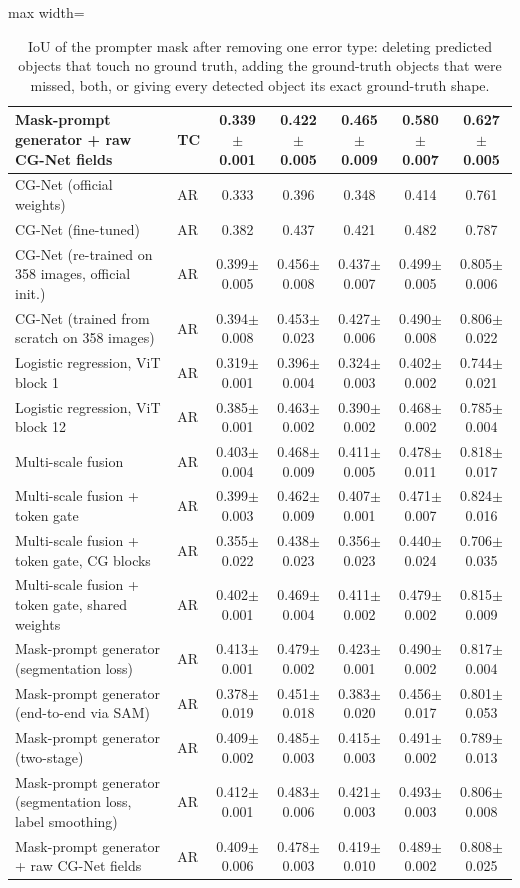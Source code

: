 \begin{table}[htbp]
\begin{adjustbox}{max width=\linewidth}
\begin{tabular}{llccccc}
Mask-prompt generator + raw CG-Net fields & TC & 0.339$\pm$0.001 & 0.422$\pm$0.005 & 0.465$\pm$0.009 & 0.580$\pm$0.007 & 0.627$\pm$0.005 \\
\midrule
CG-Net (official weights) & AR & 0.333 & 0.396 & 0.348 & 0.414 & 0.761 \\
CG-Net (fine-tuned) & AR & 0.382 & 0.437 & 0.421 & 0.482 & 0.787 \\
CG-Net (re-trained on 358 images, official init.) & AR & 0.399$\pm$0.005 & 0.456$\pm$0.008 & 0.437$\pm$0.007 & 0.499$\pm$0.005 & 0.805$\pm$0.006 \\
CG-Net (trained from scratch on 358 images) & AR & 0.394$\pm$0.008 & 0.453$\pm$0.023 & 0.427$\pm$0.006 & 0.490$\pm$0.008 & 0.806$\pm$0.022 \\
Logistic regression, ViT block 1 & AR & 0.319$\pm$0.001 & 0.396$\pm$0.004 & 0.324$\pm$0.003 & 0.402$\pm$0.002 & 0.744$\pm$0.021 \\
Logistic regression, ViT block 12 & AR & 0.385$\pm$0.001 & 0.463$\pm$0.002 & 0.390$\pm$0.002 & 0.468$\pm$0.002 & 0.785$\pm$0.004 \\
Multi-scale fusion & AR & 0.403$\pm$0.004 & 0.468$\pm$0.009 & 0.411$\pm$0.005 & 0.478$\pm$0.011 & 0.818$\pm$0.017 \\
Multi-scale fusion + token gate & AR & 0.399$\pm$0.003 & 0.462$\pm$0.009 & 0.407$\pm$0.001 & 0.471$\pm$0.007 & 0.824$\pm$0.016 \\
Multi-scale fusion + token gate, CG blocks & AR & 0.355$\pm$0.022 & 0.438$\pm$0.023 & 0.356$\pm$0.023 & 0.440$\pm$0.024 & 0.706$\pm$0.035 \\
Multi-scale fusion + token gate, shared weights & AR & 0.402$\pm$0.001 & 0.469$\pm$0.004 & 0.411$\pm$0.002 & 0.479$\pm$0.002 & 0.815$\pm$0.009 \\
Mask-prompt generator (segmentation loss) & AR & 0.413$\pm$0.001 & 0.479$\pm$0.002 & 0.423$\pm$0.001 & 0.490$\pm$0.002 & 0.817$\pm$0.004 \\
Mask-prompt generator (end-to-end via SAM) & AR & 0.378$\pm$0.019 & 0.451$\pm$0.018 & 0.383$\pm$0.020 & 0.456$\pm$0.017 & 0.801$\pm$0.053 \\
Mask-prompt generator (two-stage) & AR & 0.409$\pm$0.002 & 0.485$\pm$0.003 & 0.415$\pm$0.003 & 0.491$\pm$0.002 & 0.789$\pm$0.013 \\
Mask-prompt generator (segmentation loss, label smoothing) & AR & 0.412$\pm$0.001 & 0.483$\pm$0.006 & 0.421$\pm$0.003 & 0.493$\pm$0.003 & 0.806$\pm$0.008 \\
Mask-prompt generator + raw CG-Net fields & AR & 0.409$\pm$0.006 & 0.478$\pm$0.003 & 0.419$\pm$0.010 & 0.489$\pm$0.002 & 0.808$\pm$0.025 \\
\bottomrule
\end{tabular}
\end{adjustbox}
\caption{IoU of the prompter mask after removing one error type: deleting predicted objects that touch no ground truth, adding the ground-truth objects that were missed, both, or giving every detected object its exact ground-truth shape.}
\label{tab:decomposition_infused_mlp1}
\end{table}
